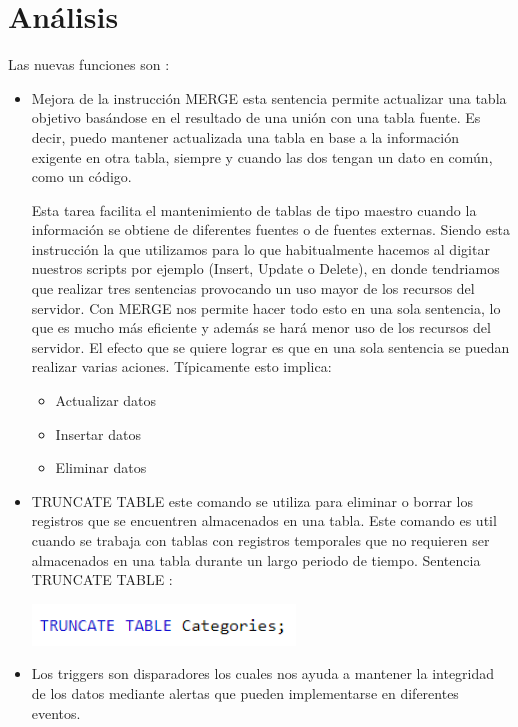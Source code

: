 \documentclass[twoside,twocolumn]{article}
\begin{document}
\section{Análisis}
Las nuevas funciones son :
\begin{itemize}
\item Mejora de la instrucción MERGE esta sentencia permite actualizar una tabla objetivo basándose en el resultado de una unión con una tabla fuente. Es decir, puedo mantener actualizada una tabla en base a la información exigente en otra tabla, siempre y cuando las dos tengan un dato en común, como un código.

Esta tarea facilita el mantenimiento de tablas de tipo maestro cuando la información se obtiene de diferentes fuentes o de fuentes externas. Siendo esta instrucción la que utilizamos para lo que habitualmente hacemos al digitar nuestros scripts por ejemplo (Insert, Update o Delete), en donde tendriamos que realizar tres sentencias provocando un uso mayor de los recursos del servidor. Con MERGE nos permite hacer todo esto en una sola sentencia, lo que es mucho más eficiente y además se hará menor uso de los recursos del servidor.
El efecto que se quiere lograr es que en una sola sentencia se puedan realizar varias aciones. Típicamente esto implica:
\begin{itemize}
\item Actualizar datos
\item Insertar datos
\item Eliminar datos
\end{itemize}

\item TRUNCATE TABLE este comando se utiliza para eliminar o borrar los registros que se encuentren almacenados en una tabla. Este comando es util cuando se trabaja con tablas con registros temporales que no requieren ser almacenados en una tabla durante un largo periodo de tiempo.
Sentencia TRUNCATE TABLE :

\begin{center}
\includegraphics[width=7cm]{./Imagenes/01} 
\end{center}

\item Los triggers son disparadores los cuales nos ayuda a mantener la integridad de los datos mediante alertas que pueden implementarse en diferentes eventos.
 

\end{itemize}
\end{document}
